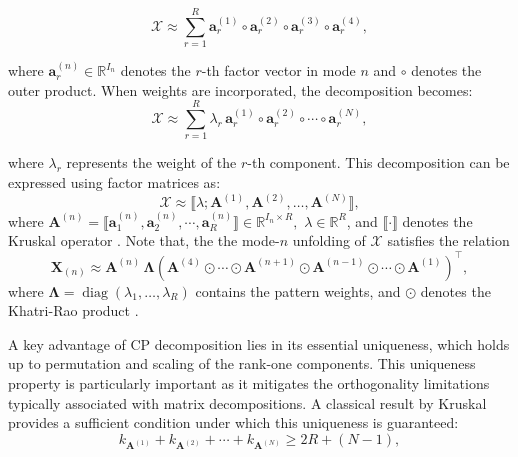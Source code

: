 \documentclass{ieeeaccess}
\begin{document}
\begin{equation}
\mathcal{X} \approx \sum_{r=1}^{R} \mathbf{a}_r^{(1)} \circ \mathbf{a}_r^{(2)} \circ \mathbf{a}_r^{(3)} \circ \mathbf{a}_r^{(4)},
\label{eq:cp-basic}
\end{equation}

\noindent where $\mathbf{a}_r^{(n)} \in \mathbb{R}^{I_n}$ denotes the $r$-th factor vector in mode $n$ and $\circ$ denotes the outer product. When weights are incorporated, the decomposition becomes:
\begin{equation}
\mathcal{X} \approx \sum_{r=1}^{R} \lambda_{r} \, \mathbf{a}_r^{(1)} \circ \mathbf{a}_r^{(2)} \circ \cdots \circ \mathbf{a}_r^{(N)},
\label{eq:cp-lambda}
\end{equation}

\noindent where $\lambda_r$ represents the weight of the $r$-th component. This decomposition can be expressed using factor matrices as: 
\begin{equation}
\mathcal{X} \approx \llbracket {\lambda}; \mathbf{A}^{(1)}, \mathbf{A}^{(2)}, \ldots, \mathbf{A}^{(N)} \rrbracket,
\label{eq:kruskal-form}
\end{equation}
\noindent where
\(
\mathbf{A}^{(n)} = \llbracket\mathbf{a}_{1}^{(n)}, \mathbf{a}_{2}^{(n)}, \cdots, \mathbf{a}_{R}^{(n)} \rrbracket \in \mathbb{R}^{I_n \times R}, 
\)
$\lambda \in \mathbb{R}^{R}$, and $\llbracket \cdot \rrbracket$ denotes the Kruskal operator \cite{kruskal1977three}. Note that, 
the the mode-$n$ unfolding of $\mathcal{X}$ satisfies the relation
\begin{equation} \label{eq:mode_n_unfolding}
\mathbf{X}_{(n)} \approx \mathbf{A}^{(n)} \, \boldsymbol{\Lambda} 
\left( \mathbf{A}^{(4)} \odot \cdots \odot \mathbf{A}^{(n+1)} \odot \mathbf{A}^{(n-1)} \odot \cdots \odot \mathbf{A}^{(1)} \right)^\top,
\end{equation}
where $\boldsymbol{\Lambda} = \operatorname{diag}(\lambda_1, \dots, \lambda_R)$ contains the pattern weights, and $\odot$ denotes the Khatri-Rao product \cite{kruskal1977three}.


A key advantage of CP decomposition lies in its essential uniqueness, which holds up to permutation and scaling of the rank-one components. This uniqueness property is particularly important as it mitigates the orthogonality limitations typically associated with matrix decompositions. A classical result by Kruskal provides a sufficient condition under which this uniqueness is guaranteed:
\begin{equation}
k_{\mathbf{A}^{(1)}} + k_{\mathbf{A}^{(2)}} + \cdots + k_{\mathbf{A}^{(N)}} \geq 2R + (N-1),
\end{equation}
\end{document}
